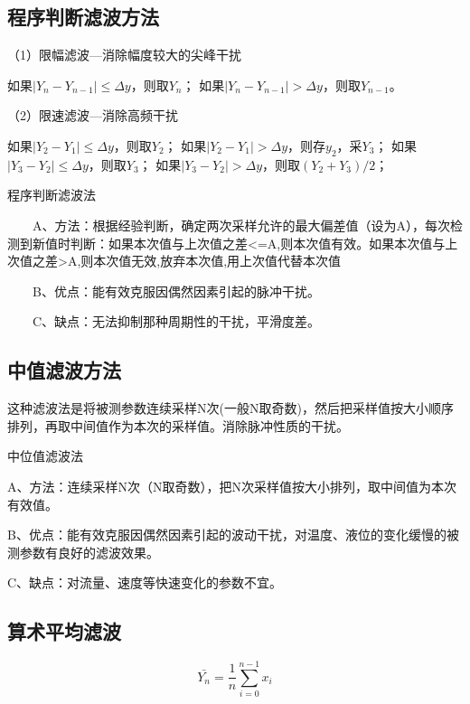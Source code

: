 \subsection{程序判断滤波方法}

（1）限幅滤波—消除幅度较大的尖峰干扰

如果$|Y_n-Y_{n-1}|\le \Delta y$，则取$Y_n$； 如果$|Y_n-Y_{n-1}|> \Delta y$，则取$Y_{n-1}$。

（2）限速滤波—消除高频干扰

如果$|Y_2-Y_{1}|\le \Delta y$，则取$Y_2$； 如果$|Y_2-Y_{1}|> \Delta y$，则存$y_2$，采$Y_{3}$；
如果$|Y_3-Y_{2}|\le \Delta y$，则取$Y_3$； 如果$|Y_3-Y_{2}|> \Delta y$，则取$({Y_{2}+Y_{3}})/2$；


\begin{remark}
程序判断滤波法

　　A、方法：根据经验判断，确定两次采样允许的最大偏差值（设为A），每次检测到新值时判断：如果本次值与上次值之差<=A,则本次值有效。如果本次值与上次值之差>A,则本次值无效,放弃本次值,用上次值代替本次值

　　B、优点：能有效克服因偶然因素引起的脉冲干扰。

　　C、缺点：无法抑制那种周期性的干扰，平滑度差。
\end{remark}

\subsection{中值滤波方法}

这种滤波法是将被测参数连续采样N次(一般N取奇数)，然后把采样值按大小顺序排列，再取中间值作为本次的采样值。消除脉冲性质的干扰。
\begin{remark}
  中位值滤波法

A、方法：连续采样N次（N取奇数），把N次采样值按大小排列，取中间值为本次有效值。

B、优点：能有效克服因偶然因素引起的波动干扰，对温度、液位的变化缓慢的被测参数有良好的滤波效果。

C、缺点：对流量、速度等快速变化的参数不宜。

\end{remark}
\subsection{算术平均滤波}

\begin{equation}
\bar{Y_n} = \frac{1}{n}\sum_{i=0}^{n-1}x_i
\end{equation}


